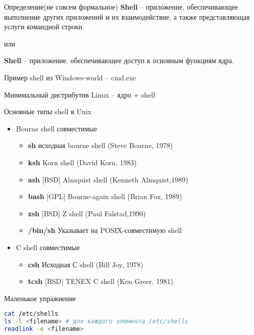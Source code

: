 \begin{frame}[fragile]{Определение(не совсем формальное)}
\textbf{Shell} -- приложение, обеспечивающее выполнение других приложений и их взаимодействие, а также представляющая услуги командной строки. 
\begin{center}
  или
\end{center}
\textbf{Shell} -- приложение, обеспечивающее доступ к основным функциям ядра.

\pause
\vspace{0.5in}
Пример shell из Windows-world -- cmd.exe
\vspace{0.5in}

Минимальный дистрибутив Linux -- ядро + shell 

\end{frame}
\begin{frame}[fragile]{Основные типы shell в Unix}
  \begin{itemize}
    \item Bourne shell совместимые
      \begin{itemize}
        \item \textbf{sh} исходная bourne shell (Steve Bourne, 1978)
        \item \textbf{ksh} Korn shell (David Korn, 1983)
        \item \textbf{ash} $[$BSD$]$ Almquist shell (Kenneth Almquist,1989)  
        \item \textbf{bash} $[$GPL$]$ Bourne-again shell (Brian Fox, 1989)
        \item \textbf{zsh} $[$BSD$]$ Z shell (Paul Falstad,1990)
        \item \textbf{/bin/sh} Указывает на POSIX-совместимую shell
      \end{itemize}
  \item C shell совместимые
      \begin{itemize}
        \item \textbf{csh}  Исходная С shell (Bill Joy, 1978)
        \item \textbf{tcsh} $[$BSD$]$ TENEX C shell (Ken Greer, 1981)
       \end{itemize}
  \end{itemize}
\end{frame}
\begin{frame}[fragile]{Маленькое упражнение}
\begin{lstlisting}[language=bash]
cat /etc/shells
ls -l <filename> # для каждого элемента /etc/shells
readlink -e <filename> 
\end{lstlisting}
\end{frame}
